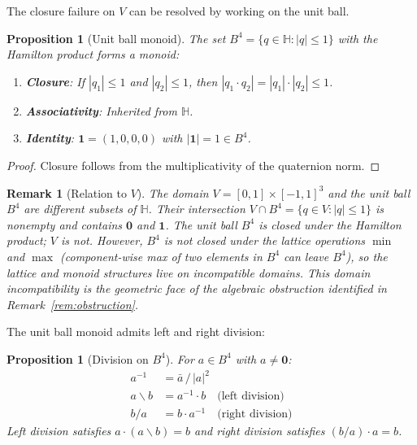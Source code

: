\documentclass[11pt,a4paper]{article}
\newtheorem{proposition}[theorem]{Proposition}
\newtheorem{remark}[theorem]{Remark}
\newcommand{\Hq}{\mathbb{H}}
\begin{document}
The closure failure on $V$ can be resolved by working on the unit ball.

\begin{proposition}[Unit ball monoid]
\label{prop:ball-monoid}
The set $B^4 = \{q \in \Hq : |q| \leq 1\}$ with the Hamilton product
forms a monoid:
\begin{enumerate}[nosep]
\item \textbf{Closure}: If $|q_1| \leq 1$ and $|q_2| \leq 1$, then
  $|q_1 \cdot q_2| = |q_1| \cdot |q_2| \leq 1$.
\item \textbf{Associativity}: Inherited from $\Hq$.
\item \textbf{Identity}: $\mathbf{1} = (1, 0, 0, 0)$ with $|\mathbf{1}| = 1 \in B^4$.
\end{enumerate}
\end{proposition}

\begin{proof}
Closure follows from the multiplicativity of the quaternion norm.
\end{proof}

\begin{remark}[Relation to $V$]
The domain $V = [0,1] \times [-1,1]^3$ and the unit ball $B^4$ are
different subsets of $\Hq$. Their intersection
$V \cap B^4 = \{q \in V : |q| \leq 1\}$ is nonempty and contains
$\mathbf{0}$ and $\mathbf{1}$. The unit ball $B^4$ is closed under
the Hamilton product; $V$ is not. However, $B^4$ is not closed under
the lattice operations $\min$ and $\max$ (component-wise max of two
elements in $B^4$ can leave $B^4$), so the lattice and monoid
structures live on incompatible domains. This domain incompatibility
is the geometric face of the algebraic obstruction identified in
Remark~\ref{rem:obstruction}.
\end{remark}

The unit ball monoid admits left and right division:

\begin{proposition}[Division on $B^4$]
\label{prop:division}
For $a \in B^4$ with $a \neq \mathbf{0}$:
\begin{align}
  a^{-1} &= \bar{a}\,/\,|a|^2 \label{eq:inv} \\
  a \backslash b &= a^{-1} \cdot b \quad\text{(left division)} \label{eq:ldiv} \\
  b / a &= b \cdot a^{-1} \quad\text{(right division)} \label{eq:rdiv}
\end{align}
Left division satisfies $a \cdot (a \backslash b) = b$ and right
division satisfies $(b / a) \cdot a = b$.
\end{proposition}
\end{document}
